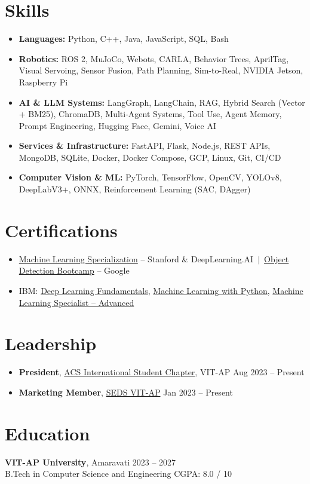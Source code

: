 \documentclass[a4paper,10pt]{article}
\begin{document}
\section{Skills}
\begin{itemize}
  \item \textbf{Languages:} Python, C++, Java, JavaScript, SQL, Bash
  \item \textbf{Robotics:} ROS 2, MuJoCo, Webots, CARLA, Behavior Trees, AprilTag, Visual Servoing, Sensor Fusion, Path Planning, Sim-to-Real, NVIDIA Jetson, Raspberry Pi
  \item \textbf{AI \& LLM Systems:} LangGraph, LangChain, RAG, Hybrid Search (Vector + BM25), ChromaDB, Multi-Agent Systems, Tool Use, Agent Memory, Prompt Engineering, Hugging Face, Gemini, Voice AI
  \item \textbf{Services \& Infrastructure:} FastAPI, Flask, Node.js, REST APIs, MongoDB, SQLite, Docker, Docker Compose, GCP, Linux, Git, CI/CD
  \item \textbf{Computer Vision \& ML:} PyTorch, TensorFlow, OpenCV, YOLOv8, DeepLabV3+, ONNX, Reinforcement Learning (SAC, DAgger)
\end{itemize}

\section{Certifications}
\begin{itemize}
  \item \href{https://drive.google.com/file/d/1bYBUAIvUOMfzw3lgQpruA0vFzStBH2Kx/view?usp=sharing}{Machine Learning Specialization} -- Stanford \& DeepLearning.AI \,$|$\, \href{https://www.cert.devtown.in/verify/Z1GAbEE}{Object Detection Bootcamp} -- Google
  \item IBM: \href{https://courses.cognitiveclass.ai/certificates/b24fd91a07c14d8ba2b6dbf0d6a6c6c5}{Deep Learning Fundamentals}, \href{https://www.credly.com/badges/91a4bb99-9a17-4c7c-b000-3c7e54c148eb/print}{Machine Learning with Python}, \href{https://www.credly.com/badges/1d70a2bb-7afa-4ef8-9e2f-a945321c0e51/print}{Machine Learning Specialist -- Advanced}
\end{itemize}

\section{Leadership}
\begin{itemize}
  \item \textbf{President}, \href{https://acsvitap.in/}{ACS International Student Chapter}, VIT-AP \hfill Aug 2023 -- Present
  \item \textbf{Marketing Member}, \href{https://sedsvitap.in/index.html}{SEDS VIT-AP} \hfill Jan 2023 -- Present
\end{itemize}

\section{Education}
\textbf{VIT-AP University}, Amaravati \hfill 2023 -- 2027\\
B.Tech in Computer Science and Engineering \hfill CGPA: 8.0 / 10
\end{document}
